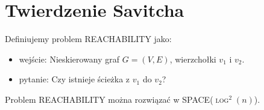 \section{Twierdzenie Savitcha}

\begin{definition}
    Definiujemy problem \textsc{REACHABILITY} jako:
    \begin{itemize}
        \item wejście: Nieskierowany graf \( G = (V, E) \), wierzchołki \(v_1\) i \(v_2\).
        \item pytanie: Czy istnieje ścieżka z \(v_1\) do \(v_2\)? 
    \end{itemize}
\end{definition}

\begin{theorem}
    Problem \textsc{REACHABILITY} można rozwiązać w \textsc{SPACE(\(\log^2(n)\))}.
\end{theorem}

